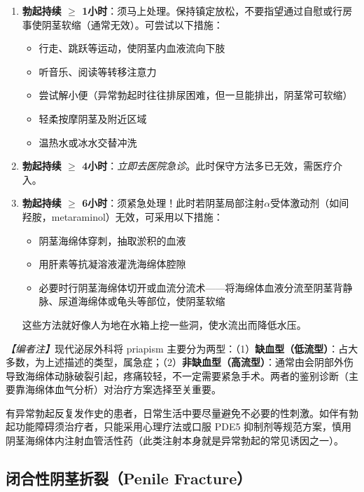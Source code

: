 \begin{enumerate}
	\item \textbf{勃起持续 $\geq$ 1小时}：须马上处理。保持镇定放松，不要指望通过自慰或行房事使阴茎软缩（通常无效）。可尝试以下措施：
	\begin{itemize}
		\item 行走、跳跃等运动，使阴茎内血液流向下肢
		\item 听音乐、阅读等转移注意力
		\item 尝试解小便（异常勃起时往往排尿困难，但一旦能排出，阴茎常可软缩）
		\item 轻柔按摩阴茎及附近区域
		\item 温热水或冰水交替冲洗
	\end{itemize}

	\item \textbf{勃起持续 $\geq$ 4小时}：\textit{立即去医院急诊}。此时保守方法多已无效，需医疗介入。

	\item \textbf{勃起持续 $\geq$ 6小时}：须紧急处理！此时若阴茎局部注射$\alpha$受体激动剂（如间羟胺，metaraminol）无效，可采用以下措施：
	\begin{itemize}
		\item 阴茎海绵体穿刺，抽取淤积的血液
		\item 用肝素等抗凝溶液灌洗海绵体腔隙
		\item 必要时行阴茎海绵体切开或血流分流术——将海绵体血液分流至阴茎背静脉、尿道海绵体或龟头等部位，使阴茎软缩
	\end{itemize}
	这些方法就好像人为地在水箱上挖一些洞，使水流出而降低水压。
\end{enumerate}

\noindent\textit{【编者注】}现代泌尿外科将 priapism 主要分为两型：（1）\textbf{缺血型（低流型）}：占大多数，为上述描述的类型，属急症；（2）\textbf{非缺血型（高流型）}：通常由会阴部外伤导致海绵体动脉破裂引起，疼痛较轻，不一定需要紧急手术。两者的鉴别诊断（主要靠海绵体血气分析）对治疗方案选择至关重要。

\begin{tcolorbox}[colback=pink!5!white,colframe=red!50!black,title=贴心小叮咛]
有异常勃起反复发作史的患者，日常生活中要尽量避免不必要的性刺激。如伴有勃起功能障碍须治疗者，只能采用心理疗法或口服 PDE5 抑制剂等规范方案，慎用阴茎海绵体内注射血管活性药（此类注射本身就是异常勃起的常见诱因之一）。
\end{tcolorbox}

\subsection{闭合性阴茎折裂（Penile Fracture）}

